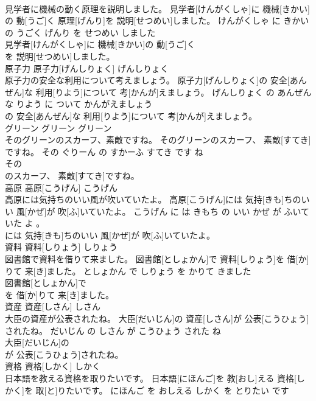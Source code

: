 \documentclass[8pt]{extreport}
\begin{document}
\begin{CJK}{UTF8}{min}
\\	見学者に機械の動く原理を説明しました。	見学者[けんがくしゃ]に 機械[きかい]の 動[うご]く 原理[げんり]を 説明[せつめい]しました。	けんがくしゃ に きかい の うごく げんり を せつめい しました	
\\	見学者[けんがくしゃ]に 機械[きかい]の 動[うご]く
\\	を 説明[せつめい]しました。			
\\	原子力	原子力[げんしりょく]	げんしりょく	
\\	原子力の安全な利用について考えましょう。	原子力[げんしりょく]の 安全[あんぜん]な 利用[りよう]について 考[かんが]えましょう。	げんしりょく の あんぜん な りよう に ついて かんがえましょう	
\\	の 安全[あんぜん]な 利用[りよう]について 考[かんが]えましょう。			
\\	グリーン	グリーン	グリーン	
\\	そのグリーンのスカーフ、素敵ですね。	そのグリーンのスカーフ、 素敵[すてき]ですね。	その ぐりーん の すかーふ すてき です ね	
\\	その
\\	のスカーフ、 素敵[すてき]ですね。			
\\	高原	高原[こうげん]	こうげん	
\\	高原には気持ちのいい風が吹いていたよ。	高原[こうげん]には 気持[きも]ちのいい 風[かぜ]が 吹[ふ]いていたよ。	こうげん に は きもち の いい かぜ が ふいていた よ 。	
\\	には 気持[きも]ちのいい 風[かぜ]が 吹[ふ]いていたよ。			
\\	資料	資料[しりょう]	しりょう	
\\	図書館で資料を借りて来ました。	図書館[としょかん]で 資料[しりょう]を 借[か]りて 来[き]ました。	としょかん で しりょう を かりて きました	
\\	図書館[としょかん]で
\\	を 借[か]りて 来[き]ました。			
\\	資産	資産[しさん]	しさん	
\\	大臣の資産が公表されたね。	大臣[だいじん]の 資産[しさん]が 公表[こうひょう]されたね。	だいじん の しさん が こうひょう された ね	
\\	大臣[だいじん]の
\\	が 公表[こうひょう]されたね。			
\\	資格	資格[しかく]	しかく	
\\	日本語を教える資格を取りたいです。	日本語[にほんご]を 教[おし]える 資格[しかく]を 取[と]りたいです。	にほんご を おしえる しかく を とりたい です	

\end{CJK}
\end{document}

